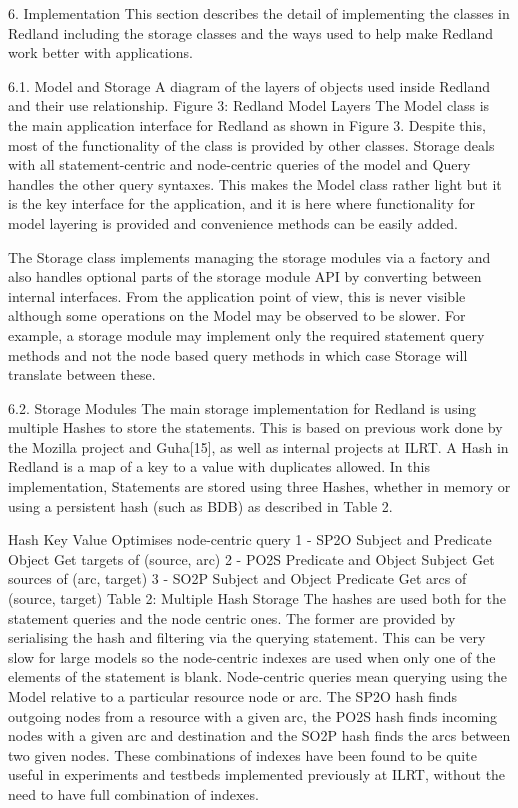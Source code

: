 \documentclass[11pt]{article}
\begin{document}
    6. Implementation
    This section describes the detail of implementing the classes in Redland including the storage classes and the ways used to help make Redland work better with applications.

    6.1. Model and Storage
    A diagram of the layers of objects used inside Redland and their use relationship.
    Figure 3: Redland Model Layers
    The Model class is the main application interface for Redland as shown in Figure 3. Despite this, most of the functionality of the class is provided by other classes. Storage deals with all statement-centric and node-centric queries of the model and Query handles the other query syntaxes. This makes the Model class rather light but it is the key interface for the application, and it is here where functionality for model layering is provided and convenience methods can be easily added.

    The Storage class implements managing the storage modules via a factory and also handles optional parts of the storage module API by converting between internal interfaces. From the application point of view, this is never visible although some operations on the Model may be observed to be slower. For example, a storage module may implement only the required statement query methods and not the node based query methods in which case Storage will translate between these.

    6.2. Storage Modules
    The main storage implementation for Redland is using multiple Hashes to store the statements. This is based on previous work done by the Mozilla project and Guha[15], as well as internal projects at ILRT. A Hash in Redland is a map of a key to a value with duplicates allowed. In this implementation, Statements are stored using three Hashes, whether in memory or using a persistent hash (such as BDB) as described in Table 2.

    Hash Key Value Optimises node-centric query
    1 - SP2O Subject and Predicate Object Get targets of (source, arc)
    2 - PO2S Predicate and Object Subject Get sources of (arc, target)
    3 - SO2P Subject and Object Predicate Get arcs of (source, target)
    Table 2: Multiple Hash Storage
    The hashes are used both for the statement queries and the node centric ones. The former are provided by serialising the hash and filtering via the querying statement. This can be very slow for large models so the node-centric indexes are used when only one of the elements of the statement is blank. Node-centric queries mean querying using the Model relative to a particular resource node or arc. The SP2O hash finds outgoing nodes from a resource with a given arc, the PO2S hash finds incoming nodes with a given arc and destination and the SO2P hash finds the arcs between two given nodes. These combinations of indexes have been found to be quite useful in experiments and testbeds implemented previously at ILRT, without the need to have full combination of indexes.
\end{document}
